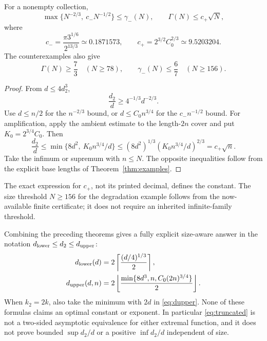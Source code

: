 \begin{corollary}\label{cor:truncated}
For a nonempty collection,
\begin{equation}\label{eq:truncated}
 \boxed{\max\{N^{-2/3},\ c_-N^{-1/2}\}\le\gamma_-(N),\qquad
 \Gamma(N)\le c_+\sqrt N,}
\end{equation}
where
\[
 c_-=\frac{\pi3^{1/6}}{2^{13/3}}\simeq0.1871573,
 \qquad c_+=2^{3/2}C_0^{2/3}\simeq9.5203204.
\]
The counterexamples also give
\[
 \Gamma(N)\ge\frac73\quad(N\ge78),\qquad
 \gamma_-(N)\le\frac67\quad(N\ge156).
\]
\end{corollary}
\begin{proof}
From $d\le4d_2^3$,
\[
 \frac{d_2}{d}\ge4^{-1/3}d^{-2/3}.
\]
Use $d\le n/2$ for the $n^{-2/3}$ bound, or $d\le C_0n^{3/4}$ for the $c_-n^{-1/2}$ bound. For amplification, apply the ambient estimate to the length-$2n$ cover and put $K_0=2^{3/4}C_0$. Then
\[
 \frac{d_2}{d}\le\min\{8d^2,\ K_0n^{3/4}/d\}
 \le(8d^2)^{1/3}(K_0n^{3/4}/d)^{2/3}
 =c_+\sqrt n.
\]
Take the infimum or supremum with $n\le N$. The opposite inequalities follow from the explicit base lengths of Theorem~\ref{thm:examples}.
\end{proof}
The exact expression for $c_+$, not its printed decimal, defines the constant. The size threshold $N\ge156$ for the degradation example follows from the now-available finite certificate; it does not require an inherited infinite-family threshold.

Combining the preceding theorems gives a fully explicit size-aware answer in the notation $d_{\rm lower}\le d_2\le d_{\rm upper}$:
\begin{align}
 d_{\rm lower}(d)&=2\left\lceil \frac{(d/4)^{1/3}}2\right\rceil,\label{eq:dlower}\\
 d_{\rm upper}(d,n)&=2\left\lfloor \frac{\min\{8d^3,n,C_0(2n)^{3/4}\}}2\right\rfloor.
 \label{eq:dupper}
\end{align}
When $k_2=2k$, also take the minimum with $2d$ in \eqref{eq:dupper}. None of these formulas claims an optimal constant or exponent. In particular \eqref{eq:truncated} is not a two-sided asymptotic equivalence for either extremal function, and it does not prove bounded $\sup d_2/d$ or a positive $\inf d_2/d$ independent of size.
